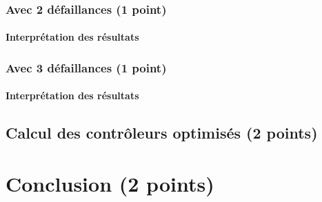 \documentclass[a4paper]{book}
\begin{document}
\subsubsection{Avec 2 défaillances (1 point)}





\paragraph{Interprétation des résultats}

\subsubsection{Avec 3 défaillances (1 point)}





\paragraph{Interprétation des résultats}

\subsection{Calcul des contrôleurs optimisés (2 points)}

\section{Conclusion (2 points)}
\end{document}

